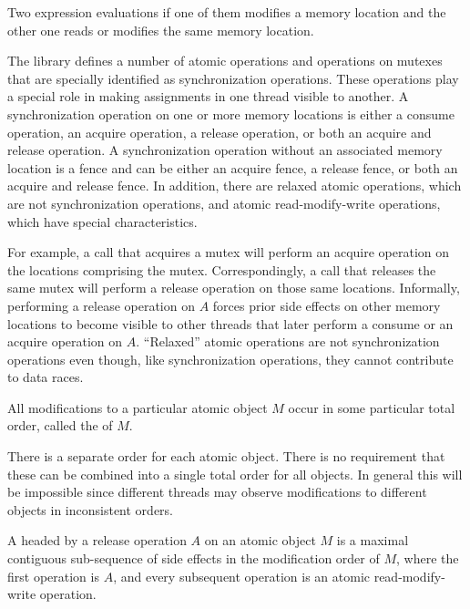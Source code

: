 \pnum
Two expression evaluations  if one of them modifies a memory
location and the other one reads or modifies the same
memory location.

\pnum
The library defines a number of atomic operations and
operations on mutexes that are specially identified as
synchronization operations. These operations play a special role in making
assignments in one thread visible to another. A synchronization operation on one
or more memory locations is either a consume operation, an acquire operation, a
release operation, or both an acquire and release operation. A synchronization
operation without an associated memory location is a fence and can be either an
acquire fence, a release fence, or both an acquire and release fence. In
addition, there are relaxed atomic operations, which are not synchronization
operations, and atomic read-modify-write operations, which have special
characteristics.
\begin{note}
For example, a call that acquires a mutex will
perform an acquire operation on the locations comprising the mutex.
Correspondingly, a call that releases the same mutex will perform a release
operation on those same locations. Informally, performing a release operation on
$A$ forces prior
%
side effects on other memory locations to become visible
to other threads that later perform a consume or an acquire operation on
$A$. ``Relaxed'' atomic operations are not synchronization operations even
though, like synchronization operations, they cannot contribute to data races.
\end{note}

\pnum
All modifications to a particular atomic object $M$ occur in some
particular total order, called the  of $M$.
\begin{note}
There is a separate order for each
atomic object. There is no requirement that these can be combined into a single
total order for all objects. In general this will be impossible since different
threads may observe modifications to different objects in inconsistent orders.
\end{note}

\pnum
A  headed
by a release operation $A$ on an atomic object $M$
is a maximal contiguous sub-sequence of
%
side effects in the modification order of $M$,
where the first operation is $A$, and
every subsequent operation is an atomic read-modify-write operation.

